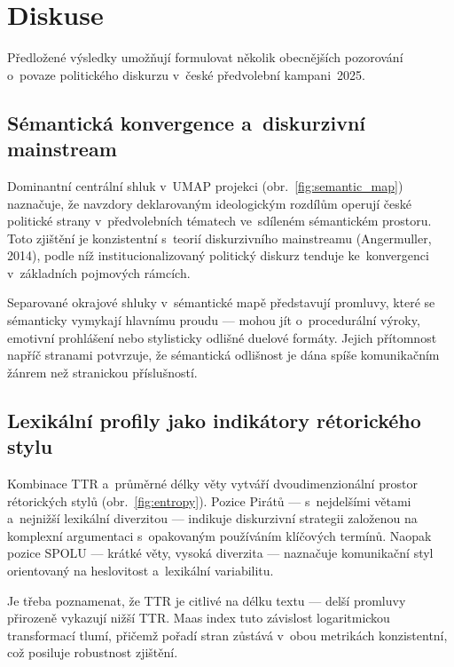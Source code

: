 \documentclass[12pt, a4paper]{article}
\begin{document}
\section{Diskuse}
\label{sec:diskuse}

Předložené výsledky umožňují formulovat několik obecnějších pozorování
o~povaze politického diskurzu v~české předvolební kampani~2025.

\subsection{Sémantická konvergence a~diskurzivní mainstream}

Dominantní centrální shluk v~UMAP projekci (obr.~\ref{fig:semantic_map})
naznačuje, že navzdory deklarovaným ideologickým rozdílům operují české
politické strany v~předvolebních tématech ve~sdíleném sémantickém prostoru.
Toto zjištění je konzistentní s~teorií diskurzivního mainstreamu
(Angermuller, 2014), podle níž institucionalizovaný politický diskurz
tenduje ke~konvergenci v~základních pojmových rámcích.

Separované okrajové shluky v~sémantické mapě představují promluvy, které
se sémanticky vymykají hlavnímu proudu — mohou jít o~procedurální výroky,
emotivní prohlášení nebo stylisticky odlišné duelové formáty. Jejich
přítomnost napříč stranami potvrzuje, že sémantická odlišnost je dána
spíše komunikačním žánrem než stranickou příslušností.

\subsection{Lexikální profily jako indikátory rétorického stylu}

Kombinace TTR a~průměrné délky věty vytváří dvoudimenzionální prostor
rétorických stylů (obr.~\ref{fig:entropy}). Pozice Pirátů — s~nejdelšími
větami a~nejnižší lexikální diverzitou — indikuje diskurzivní strategii
založenou na komplexní argumentaci s~opakovaným používáním klíčových
termínů. Naopak pozice SPOLU — krátké věty, vysoká diverzita — naznačuje
komunikační styl orientovaný na heslovitost a~lexikální variabilitu.

Je třeba poznamenat, že TTR je citlivé na délku textu — delší promluvy
přirozeně vykazují nižší TTR. Maas index tuto závislost logaritmickou
transformací tlumí, přičemž pořadí stran zůstává v~obou metrikách
konzistentní, což posiluje robustnost zjištění.
\end{document}
